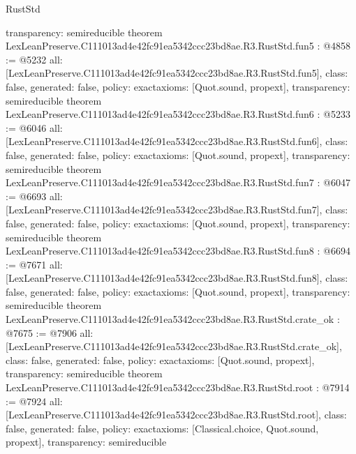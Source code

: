 \begin{lexlean}{RustStd}
\begin{coremodule}
{  transparency: semireducible
}
theorem LexLeanPreserve.C111013ad4e42fc91ea5342ccc23bd8ae.R3.RustStd.fun5 : @4858 := @5232 {
  all: [LexLeanPreserve.C111013ad4e42fc91ea5342ccc23bd8ae.R3.RustStd.fun5],
  class: false,
  generated: false,
  policy: exact{axioms: [Quot.sound, propext]},
  transparency: semireducible
}
theorem LexLeanPreserve.C111013ad4e42fc91ea5342ccc23bd8ae.R3.RustStd.fun6 : @5233 := @6046 {
  all: [LexLeanPreserve.C111013ad4e42fc91ea5342ccc23bd8ae.R3.RustStd.fun6],
  class: false,
  generated: false,
  policy: exact{axioms: [Quot.sound, propext]},
  transparency: semireducible
}
theorem LexLeanPreserve.C111013ad4e42fc91ea5342ccc23bd8ae.R3.RustStd.fun7 : @6047 := @6693 {
  all: [LexLeanPreserve.C111013ad4e42fc91ea5342ccc23bd8ae.R3.RustStd.fun7],
  class: false,
  generated: false,
  policy: exact{axioms: [Quot.sound, propext]},
  transparency: semireducible
}
theorem LexLeanPreserve.C111013ad4e42fc91ea5342ccc23bd8ae.R3.RustStd.fun8 : @6694 := @7671 {
  all: [LexLeanPreserve.C111013ad4e42fc91ea5342ccc23bd8ae.R3.RustStd.fun8],
  class: false,
  generated: false,
  policy: exact{axioms: [Quot.sound, propext]},
  transparency: semireducible
}
theorem LexLeanPreserve.C111013ad4e42fc91ea5342ccc23bd8ae.R3.RustStd.crate_ok : @7675 := @7906 {
  all: [LexLeanPreserve.C111013ad4e42fc91ea5342ccc23bd8ae.R3.RustStd.crate_ok],
  class: false,
  generated: false,
  policy: exact{axioms: [Quot.sound, propext]},
  transparency: semireducible
}
theorem LexLeanPreserve.C111013ad4e42fc91ea5342ccc23bd8ae.R3.RustStd.root : @7914 := @7924 {
  all: [LexLeanPreserve.C111013ad4e42fc91ea5342ccc23bd8ae.R3.RustStd.root],
  class: false,
  generated: false,
  policy: exact{axioms: [Classical.choice, Quot.sound, propext]},
  transparency: semireducible
}


\end{coremodule}
\end{lexlean}
